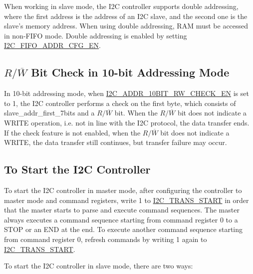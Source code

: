 \documentclass[main\_\_EN.tex]{subfiles}
\begin{document}
When working in slave mode, the I2C controller supports double addressing, where the first address is the address of an I2C slave, and the second one is the slave's memory address. When using double addressing, RAM must be accessed in non-FIFO mode. Double addressing is enabled by setting \hyperref[fielddesc:I2CFIFOADDRCFGEN]{I2C\_FIFO\_ADDR\_CFG\_EN}.

\subsection{\texorpdfstring{$R/\overline W$ Bit Check in 10-bit Addressing Mode}{R/W Bit Check in 10-bit Addressing Mode}}
In 10-bit addressing mode, when \hyperref[fielddesc:I2CADDR10BITRWCHECKEN]{I2C\_ADDR\_10BIT\_RW\_CHECK\_EN} is set to 1, the I2C controller performs a check on the first byte, which consists of slave\_addr\_first\_7bits and a $R/\overline W$ bit. When the $R/\overline W$ bit does not indicate a WRITE operation, i.e. not in line with the I2C protocol, the data transfer ends. If the check feature is not enabled, when the $R/\overline W$ bit does not indicate a WRITE, the data transfer still continues, but transfer failure may occur.

\subsection{To Start the I2C Controller}\label{subsubsec:i2c-start}
To start the I2C controller in master mode, after configuring the controller to master mode and command registers, write 1 to \hyperref[fielddesc:I2CTRANSSTART]{I2C\_TRANS\_START} in order that the master starts to parse and execute command sequences. The master always executes a command sequence starting from command register 0 to a STOP or an END at the end. To execute another command sequence starting from command register 0, refresh commands by writing 1 again to \hyperref[fielddesc:I2CTRANSSTART]{I2C\_TRANS\_START}.

To start the I2C controller in slave mode, there are two ways:
\end{document}
